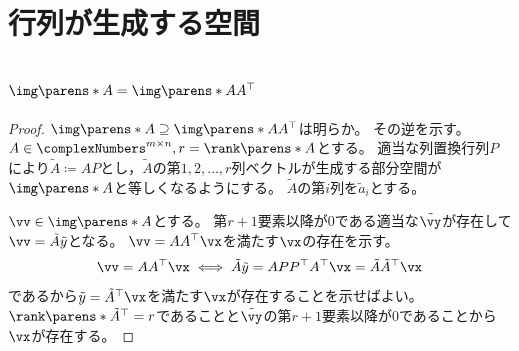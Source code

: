 \chapter{行列が生成する空間}
    \section{\texorpdfstring{$\img\parens*{A}=\img\parens*{AA^\top}$}{im(A)=im(AA\string^T)}}
        \begin{proof}
            $\img\parens*{A}\supseteq\img\parens*{AA^\top}$は明らか。
            その逆を示す。
            $A\in\complexNumbers^{m\times n},r=\rank\parens*{A}$とする。
            適当な列置換行列$P$により$\tilde{A} \coloneq AP$とし，$\tilde{A}$の第$1,2,\dots,r$列ベクトルが生成する部分空間が$\img\parens*{A}$と等しくなるようにする。
            $\tilde{A}$の第$i$列を$\tilde{a}_i$とする。
            \par
            $\vv\in\img\parens*{A}$とする。
            第$r+1$要素以降が0である適当な$\tilde{\vy}$が存在して$\vv=\tilde{A}\tilde{y}$となる。
            $\vv = AA^\top\vx$を満たす$\vx$の存在を示す。
            \[ \vv = AA^\top\vx \iff \tilde{A}\tilde{y} = APP^\top A^\top\vx = \tilde{A}\tilde{A}^\top\vx \]
            であるから$\tilde{y} = \tilde{A}^\top\vx$を満たす$\vx$が存在することを示せばよい。
            $\rank\parens*{\tilde{A}^\top} = r$であることと$\tilde{\vy}$の第$r+1$要素以降が0であることから$\vx$が存在する。
        \end{proof}